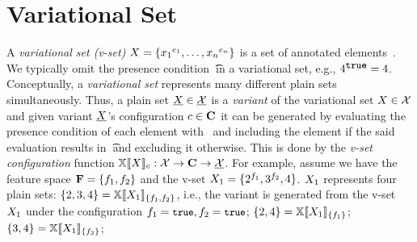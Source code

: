 \section{Variational Set}
\label{sec:vset}


A \emph{variational set (v-set)} $\vset = \setDef {\annot [\dimMeta_1] {\elem_1},\ldots, \annot [\dimMeta_n] {\elem_n}}$ 
is a set of annotated elements~\cite{EWC13fosd,Walk14onward,ATW17dbpl}.
We typically omit the presence condition \t\ in a variational set,
e.g., $\annot [\t] 4 = 4$.
%
Conceptually, a \emph{variational set} represents many different plain sets simultaneously.
Thus, a plain set $\pset \in \psetSet$  is a \emph{variant} of the variational set $\vset \in \vsetSet$ 
and given variant $\pset$'s configuration $\config \in \confSet$
it can be generated by evaluating the presence condition of each element with \config\
and including the element if the said evaluation results in \t\ and excluding it otherwise.
This is done by the \emph{v-set configuration} function
\ensuremath{\osetSem \vset : \vsetSet \to \confSet \to \psetSet}. 
For example, 
assume we have the feature space $\fSet = \setDef {\A, \B}$ 
and the v-set $\vset_1 = \setDef {\annot [\A] 2, \annot [\B] 3, 4}$.
$\vset_1$ represents four plain sets:
\ensuremath{  = \osetSem [\setDef {\A, \B}] {\vset_1}}, i.e., the variant 
 \setDef {2,3,4} is generated from the v-set $\vset_1$ under the configuration \ensuremath{\A = \t, \B = \t};
\ensuremath{ \setDef {2,4} = \osetSem [\setDef {\A}] {\vset_1}};
\ensuremath{ \setDef {3,4} = \osetSem [\setDef {\B}] {\vset_1}};
